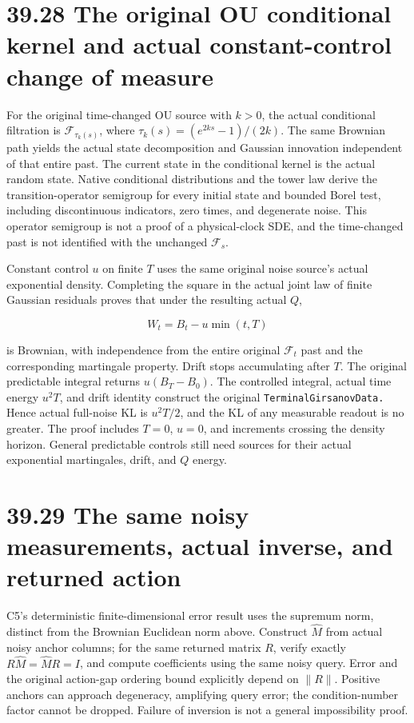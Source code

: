 \documentclass[
  english,
  11pt,
  oneside]{book}
\begin{document}
\section{39.28 The original OU conditional kernel and actual constant-control change of measure}\label{the-original-ou-conditional-kernel-and-actual-constant-control-change-of-measure}

For the original time-changed OU source with \(k>0\), the actual conditional filtration is \(\mathcal F_{\tau_k(s)}\), where \(\tau_k(s)=(e^{2ks}-1)/(2k)\). The same Brownian path yields the actual state decomposition and Gaussian innovation independent of that entire past. The current state in the conditional kernel is the actual random state. Native conditional distributions and the tower law derive the transition-operator semigroup for every initial state and bounded Borel test, including discontinuous indicators, zero times, and degenerate noise. This operator semigroup is not a proof of a physical-clock SDE, and the time-changed past is not identified with the unchanged \(\mathcal F_s\).

Constant control \(u\) on finite \(T\) uses the same original noise source's actual exponential density. Completing the square in the actual joint law of finite Gaussian residuals proves that under the resulting actual \(Q\),

\[W_t=B_t-u\min(t,T)\]

is Brownian, with independence from the entire original \(\mathcal F_t\) past and the corresponding martingale property. Drift stops accumulating after \(T\). The original predictable integral returns \(u(B_T-B_0)\). The controlled integral, actual time energy \(u^2T\), and drift identity construct the original \nolinkurl{TerminalGirsanovData.} Hence actual full-noise KL is \(u^2T/2\), and the KL of any measurable readout is no greater. The proof includes \(T=0\), \(u=0\), and increments crossing the density horizon. General predictable controls still need sources for their actual exponential martingales, drift, and \(Q\) energy.

\section{39.29 The same noisy measurements, actual inverse, and returned action}\label{the-same-noisy-measurements-actual-inverse-and-returned-action}

C5's deterministic finite-dimensional error result uses the supremum norm, distinct from the Brownian Euclidean norm above. Construct \(\widehat M\) from actual noisy anchor columns; for the same returned matrix \(R\), verify exactly \(R\widehat M=\widehat M R=I\), and compute coefficients using the same noisy query. Error and the original action-gap ordering bound explicitly depend on \(\lVert R\rVert\). Positive anchors can approach degeneracy, amplifying query error; the condition-number factor cannot be dropped. Failure of inversion is not a general impossibility proof.
\end{document}
